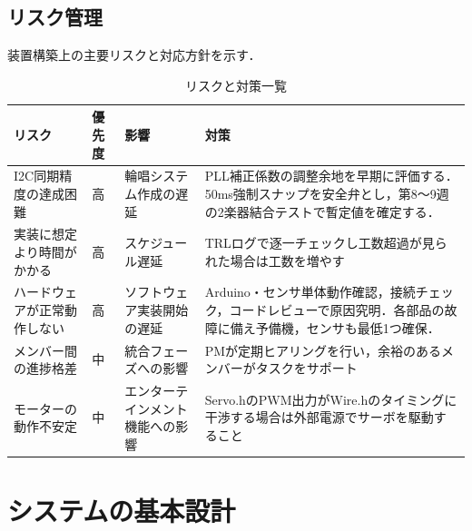 \documentclass[lualatex,book,paper=a4paper,jafontsize=11.5pt,jafontscale=1.05]{jlreq}
\begin{document}
\section{リスク管理}
装置構築上の主要リスクと対応方針を示す．

\begin{table}[htbp]
  \centering
  \begin{tabular}{L{4cm}C{1.5cm}L{4cm}L{4cm}}
    \toprule
    \textbf{リスク} & \textbf{優先度} & \textbf{影響} & \textbf{対策} \\
    \midrule
    I2C同期精度の達成困難 & 高 & 輪唱システム作成の遅延 & PLL補正係数の調整余地を早期に評価する．50ms強制スナップを安全弁とし，第8〜9週の2楽器結合テストで暫定値を確定する． \\[0.5em]
    実装に想定より時間がかかる & 高 & スケジュール遅延 & TRLログで逐一チェックし工数超過が見られた場合は工数を増やす \\[0.5em]
    ハードウェアが正常動作しない & 高 & ソフトウェア実装開始の遅延 & Arduino・センサ単体動作確認，接続チェック，コードレビューで原因究明．各部品の故障に備え予備機，センサも最低1つ確保． \\[0.5em]
    メンバー間の進捗格差 & 中 & 統合フェーズへの影響 & PMが定期ヒアリングを行い，余裕のあるメンバーがタスクをサポート \\[0.5em]
    モーターの動作不安定 & 中 & エンターテインメント機能への影響 & Servo.hのPWM出力がWire.hのタイミングに干渉する場合は外部電源でサーボを駆動すること \\[0.5em]
    \bottomrule
  \end{tabular}
  \caption{リスクと対策一覧}
  \label{tab:risk}
\end{table}
\chapter{システムの基本設計}
\end{document}
